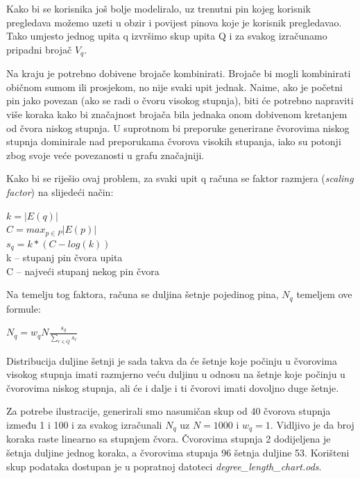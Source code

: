 \documentclass[times, utf8, seminar]{fer}
\begin{document}
Kako bi se korisnika još bolje modeliralo, uz trenutni pin kojeg korisnik pregledava možemo uzeti u obzir i povijest pinova koje je korisnik pregledavao. Tako umjesto jednog upita q izvršimo skup upita Q i za svakog izračunamo pripadni brojač $V_q$.

Na kraju je potrebno dobivene brojače kombinirati. Brojače bi mogli kombinirati običnom sumom ili prosjekom, no nije svaki upit jednak. Naime, ako je početni pin jako povezan (ako se radi o čvoru visokog stupnja), biti će potrebno napraviti više koraka kako bi značajnost brojača bila jednaka onom dobivenom kretanjem od čvora niskog stupnja. U suprotnom bi preporuke generirane čvorovima niskog stupnja dominirale nad preporukama čvorova visokih stupanja, iako su potonji zbog svoje veće povezanosti u grafu značajniji.

Kako bi se riješio ovaj problem, za svaki upit q računa se faktor razmjera (\textit{scaling factor}) na slijedeći način:

\begin{centering}
		  $ k = |E(q)| $ \\
		  $ C = max_{p \in P}|E(p)| $ \\
		  $ s_q = k * (C - log(k)) $ \\
        k -- stupanj pin čvora upita \\
		  C -- najveći stupanj nekog pin čvora 
		  \par
\end{centering}

Na temelju tog faktora, računa se duljina šetnje pojedinog pina, $N_q$ temeljem ove formule:

\begin{centering}
	$ N_q = w_qN\frac{s_q}{\sum_{r \in Q}s_r} $\par
\end{centering}

Distribucija duljine šetnji je sada takva da će šetnje koje počinju u čvorovima visokog stupnja imati razmjerno veću duljinu u odnosu na šetnje koje počinju u čvorovima niskog stupnja, ali će i dalje i ti čvorovi imati dovoljno duge šetnje.

Za potrebe ilustracije, generirali smo nasumičan skup od 40 čvorova stupnja između 1 i 100 i za svakog izračunali $N_q$ uz $N = 1000$ i $w_q = 1$. Vidljivo je da broj koraka raste linearno sa stupnjem čvora. Čvorovima stupnja 2 dodijeljena je šetnja duljine jednog koraka, a čvorovima stupnja 96 šetnja duljine 53. Korišteni skup podataka dostupan je u popratnoj datoteci \textit{degree\_length\_chart.ods}.
\end{document}
